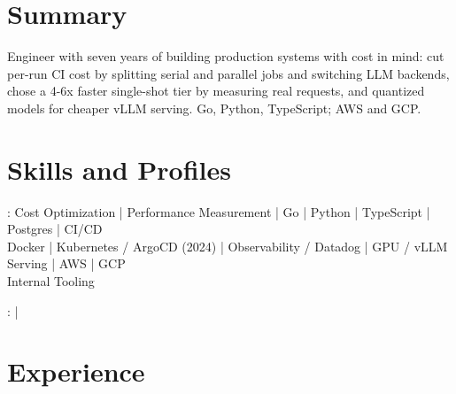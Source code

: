 \documentclass[print]{jack-resume}
\begin{document}
\pagecolor{darkmodeBackground}


\begin{minipage}[t][1cm][t]{.03\textwidth}
    \hfill
\end{minipage}

\section{Summary}
Engineer with seven years of building production systems with cost in mind: cut per-run CI cost by splitting serial and parallel jobs and switching LLM backends, chose a 4-6x faster single-shot tier by measuring real requests, and quantized models for cheaper vLLM serving. Go, Python, TypeScript; AWS and GCP.
\sectionsep

\section{Skills and Profiles}
:
Cost Optimization \hfill | \hfill
Performance Measurement \hfill | \hfill
Go \hfill | \hfill
Python \hfill | \hfill
TypeScript \hfill | \hfill
Postgres \hfill | \hfill
CI/CD \\
\hspace{1.0cm} Docker \hfill | \hfill
Kubernetes / ArgoCD (2024) \hfill | \hfill
Observability / Datadog \hfill | \hfill
GPU / vLLM Serving \hfill | \hfill
AWS \hfill | \hfill
GCP \\
\hspace{1.0cm} Internal Tooling \\

\raggedright{
    :
      \href{https://www.linkedin.com/in/jack-sturtevant/}{ \ExternalLink} |
     \href{https://github.com/jacksturt}{ \ExternalLink}}

\section{Experience}
\end{document}
